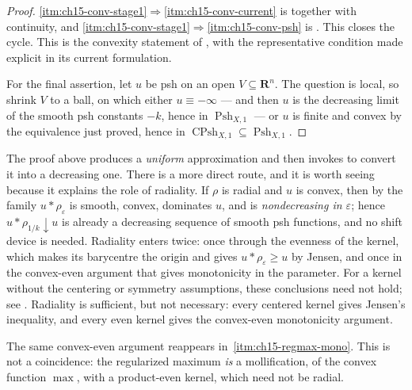 \begin{proof}
\cref{itm:ch15-conv-stage1}$\Rightarrow$\cref{itm:ch15-conv-current} is
 together with continuity, and
\cref{itm:ch15-conv-stage1}$\Rightarrow$\cref{itm:ch15-conv-psh} is
.  This closes the cycle.  This is the convexity statement of
\cite[Proposition~8.3.2]{CLD25}, with the representative condition made
explicit in its current formulation.

For the final assertion, let $u$ be psh on an open $V\subseteq\mathbf R^n$.
The question is local, so shrink $V$ to a ball, on which either
$u\equiv-\infty$ --- and then $u$ is the decreasing limit of the smooth psh
constants $-k$, hence in $\operatorname{Psh}_{X,1}$ --- or $u$ is finite and
convex by the equivalence just proved, hence in
$\operatorname{CPsh}_{X,1}\subseteq\operatorname{Psh}_{X,1}$.
\end{proof}

\begin{remark}
\label{rem:ch15-radial}
The proof above produces a \emph{uniform} approximation and then invokes
 to convert it into a decreasing one.  There is
a more direct route, and it is worth seeing because it explains the role of
radiality.  If $\rho$ is radial and $u$ is convex, then by
 the family $u*\rho_\varepsilon$ is
smooth, convex, dominates $u$, and is \emph{nondecreasing in
$\varepsilon$}; hence $u*\rho_{1/k}\downarrow u$ is already a decreasing
sequence of smooth psh functions, and no shift device is needed.  Radiality
enters twice: once through the evenness of the kernel, which makes its
barycentre the origin and gives $u*\rho_\varepsilon\ge u$ by Jensen, and once
in the convex-even argument that gives monotonicity in the parameter.  For a
kernel without the centering or symmetry assumptions, these conclusions
need not hold; see .  Radiality is sufficient,
but not necessary: every centered kernel gives Jensen's inequality, and
every even kernel gives the convex-even monotonicity argument.

The same convex-even argument reappears in
\,\cref{itm:ch15-regmax-mono}.  This is not a
coincidence: the regularized maximum \emph{is} a mollification, of the convex
function $\max$, with a product-even kernel, which need not be radial.
\end{remark}

